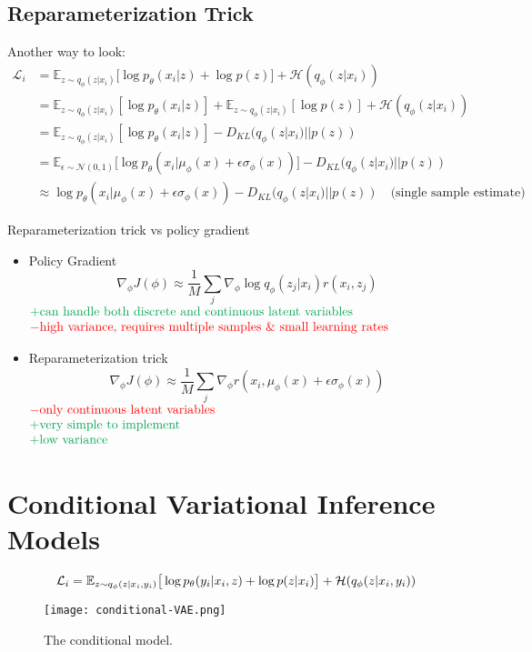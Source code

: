 \subsection{Reparameterization Trick}
Another way to look:
\begin{align}
	\mathcal{L}_i &= \mathbb{E}_{z\sim q_\phi(z|x_i)} \big[\log p_\theta(x_i|z) + \log p(z)\big] + \mathcal{H}(q_\phi(z|x_i))\\
	&= \mathbb{E}_{z\sim q_\phi(z|x_i)} [\log p_\theta(x_i|z)] + \mathbb{E}_{z\sim q_\phi(z|x_i)}[\log p(z)] + \mathcal{H}(q_\phi(z|x_i))\\
	&= \mathbb{E}_{z\sim q_\phi(z|x_i)} [\log p_\theta(x_i|z)] -D_{KL} (q_\phi(z|x_i) || p(z))\\
	&= \mathbb{E}_{\epsilon \sim \mathcal{N}(0,1)} \big[\log p_\theta(x_i|\mu_\phi(x) + \epsilon \sigma_\phi(x))\big] -D_{KL} (q_\phi(z|x_i) || p(z))\\
	&\approx \log p_\theta(x_i|\mu_\phi(x) + \epsilon \sigma_\phi(x)) -D_{KL} (q_\phi(z|x_i) || p(z)) \quad \text{(single sample estimate)}
\end{align}

\note Reparameterization trick \ac{vs} policy gradient
\begin{itemize}
	\item Policy Gradient
	\[\nabla_\phi J(\phi) \approx \frac{1}{M} \sum_j \nabla_\phi \log q_\phi(z_j|x_i) r(x_i, z_j) \]
	$\begin{matrix*}[l]
		\color{Green} + \text{can handle both discrete and continuous latent variables}\\
		\color{red} - \text{high variance, requires multiple samples \& small learning rates}
	\end{matrix*}$
	\item Reparameterization trick
	\[\nabla_\phi J(\phi) \approx \frac{1}{M} \sum_j \nabla_\phi r(x_i, \mu_\phi(x) + \epsilon \sigma_\phi(x))\]
	$\begin{matrix*}[l]
		\color{red} - \text{only continuous latent variables}\\
		\color{Green} + \text{very simple to implement}\\
		\color{Green} + \text{low variance}
	\end{matrix*}$
\end{itemize}

\section{Conditional Variational Inference Models}
\label{sec:conditional-variational-inference-models}
\begin{equation}
	\mathcal{L}_i = \mathbb{E}_{z\sim q_\phi(z|x_i, y_i)} \big[\log p_\theta(y_i|x_i, z) + \log p(z|x_i)\big] + \mathcal{H}(q_\phi(z|x_i, y_i))\\
\end{equation}
\begin{figure}[hbt!]
	\centering
	\texttt{[image: conditional-VAE.png]}
	\caption{The conditional model.}
	\label{fig:conditional-vae}
\end{figure}

